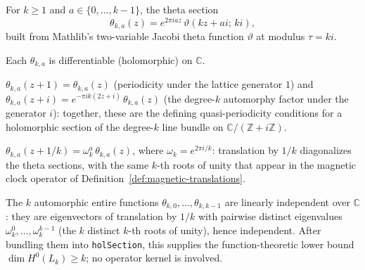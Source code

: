\begin{definition}
  \label{def:thetaSection}
  \leanok
  For $k \geq 1$ and $a \in \{0, \dots, k-1\}$, the theta section
  \[
    \theta_{k,a}(z) = e^{2\pi i a z} \, \vartheta(kz + ai;\, ki),
  \]
  built from Mathlib's two-variable Jacobi theta function $\vartheta$ at modulus $\tau = ki$.
\end{definition}

\begin{theorem}
  \label{thm:differentiable-thetaSection}
  \leanok
  Each $\theta_{k,a}$ is differentiable (holomorphic) on $\mathbb{C}$.
\end{theorem}

\begin{theorem}
  \label{thm:thetaSection-quasiPeriodic}
  \leanok
  $\theta_{k,a}(z+1) = \theta_{k,a}(z)$ (periodicity under the lattice generator $1$) and
  $\theta_{k,a}(z+i) = e^{-\pi i k (2z+i)} \, \theta_{k,a}(z)$ (the degree-$k$ automorphy factor
  under the generator $i$): together, these are the defining quasi-periodicity conditions for a
  holomorphic section of the degree-$k$ line bundle on $\mathbb{C}/(\mathbb{Z}+i\mathbb{Z})$.
\end{theorem}

\begin{theorem}
  \label{thm:thetaSection-translate}
  \leanok
  $\theta_{k,a}(z + 1/k) = \omega_k^{a} \, \theta_{k,a}(z)$, where $\omega_k = e^{2\pi i / k}$:
  translation by $1/k$ diagonalizes the theta sections, with the same $k$-th roots of unity
  that appear in the magnetic clock operator of Definition~\ref{def:magnetic-translations}.
\end{theorem}

\begin{theorem}
  \label{thm:thetaSection-linearIndependent}
  \leanok
  The $k$ automorphic entire functions $\theta_{k,0}, \dots, \theta_{k,k-1}$ are linearly
  independent over $\mathbb{C}$: they are eigenvectors of translation by $1/k$ with pairwise
  distinct eigenvalues $\omega_k^{0}, \dots, \omega_k^{k-1}$ (the $k$ distinct $k$-th roots of
  unity),
  hence independent.  After bundling them into \texttt{holSection}, this supplies the
  function-theoretic lower bound $\dim H^0(L_k)\geq k$; no operator kernel is involved.
\end{theorem}

